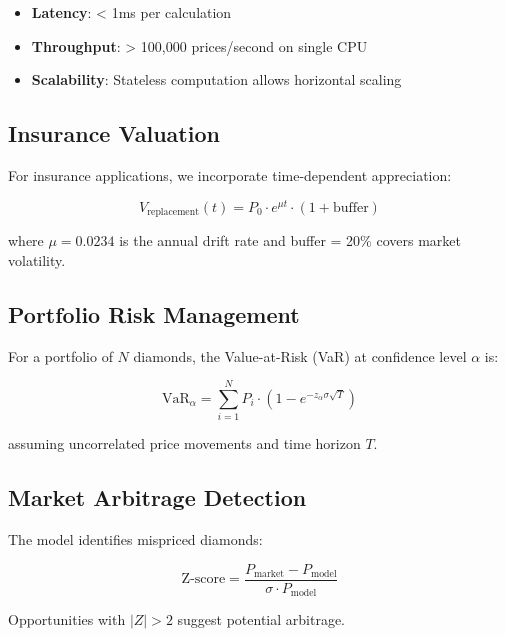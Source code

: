 \documentclass[12pt,a4paper]{article}
\begin{document}
\begin{itemize}
    \item \textbf{Latency}: < 1ms per calculation
    \item \textbf{Throughput}: > 100,000 prices/second on single CPU
    \item \textbf{Scalability}: Stateless computation allows horizontal scaling
\end{itemize}

\subsection{Insurance Valuation}

For insurance applications, we incorporate time-dependent appreciation:

\begin{equation}
V_{\text{replacement}}(t) = P_0 \cdot e^{\mu t} \cdot (1 + \text{buffer})
\end{equation}

where $\mu = 0.0234$ is the annual drift rate and buffer = 20\% covers market volatility.

\subsection{Portfolio Risk Management}

For a portfolio of $N$ diamonds, the Value-at-Risk (VaR) at confidence level $\alpha$ is:

\begin{equation}
\text{VaR}_{\alpha} = \sum_{i=1}^N P_i \cdot \left(1 - e^{-z_{\alpha} \sigma \sqrt{T}} \right)
\end{equation}

assuming uncorrelated price movements and time horizon $T$.

\subsection{Market Arbitrage Detection}

The model identifies mispriced diamonds:

\begin{equation}
\text{Z-score} = \frac{P_{\text{market}} - P_{\text{model}}}{\sigma \cdot P_{\text{model}}}
\end{equation}

Opportunities with $|Z| > 2$ suggest potential arbitrage.

\end{document}
